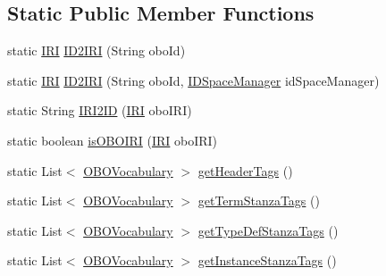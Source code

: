 \subsection*{Static Public Member Functions}
\begin{DoxyCompactItemize}
\item 
static \hyperlink{classorg_1_1semanticweb_1_1owlapi_1_1model_1_1_i_r_i}{I\-R\-I} \hyperlink{enumorg_1_1coode_1_1owlapi_1_1obo_1_1parser_1_1_o_b_o_vocabulary_a042284d9ae0a8921d6fa4c9bd5c6926a}{I\-D2\-I\-R\-I} (String obo\-Id)
\item 
static \hyperlink{classorg_1_1semanticweb_1_1owlapi_1_1model_1_1_i_r_i}{I\-R\-I} \hyperlink{enumorg_1_1coode_1_1owlapi_1_1obo_1_1parser_1_1_o_b_o_vocabulary_a06ee04f728978117ac64294ea0a9bd10}{I\-D2\-I\-R\-I} (String obo\-Id, \hyperlink{classorg_1_1coode_1_1owlapi_1_1obo_1_1parser_1_1_i_d_space_manager}{I\-D\-Space\-Manager} id\-Space\-Manager)
\item 
static String \hyperlink{enumorg_1_1coode_1_1owlapi_1_1obo_1_1parser_1_1_o_b_o_vocabulary_a585870e0b27a1178b1a15287f03253ab}{I\-R\-I2\-I\-D} (\hyperlink{classorg_1_1semanticweb_1_1owlapi_1_1model_1_1_i_r_i}{I\-R\-I} obo\-I\-R\-I)
\item 
static boolean \hyperlink{enumorg_1_1coode_1_1owlapi_1_1obo_1_1parser_1_1_o_b_o_vocabulary_ae7fbec3af1224dd1adfe3b25eb2a02db}{is\-O\-B\-O\-I\-R\-I} (\hyperlink{classorg_1_1semanticweb_1_1owlapi_1_1model_1_1_i_r_i}{I\-R\-I} obo\-I\-R\-I)
\item 
static List$<$ \hyperlink{enumorg_1_1coode_1_1owlapi_1_1obo_1_1parser_1_1_o_b_o_vocabulary}{O\-B\-O\-Vocabulary} $>$ \hyperlink{enumorg_1_1coode_1_1owlapi_1_1obo_1_1parser_1_1_o_b_o_vocabulary_af20f3e5ee71abf35c4e0c42f8222b91a}{get\-Header\-Tags} ()
\item 
static List$<$ \hyperlink{enumorg_1_1coode_1_1owlapi_1_1obo_1_1parser_1_1_o_b_o_vocabulary}{O\-B\-O\-Vocabulary} $>$ \hyperlink{enumorg_1_1coode_1_1owlapi_1_1obo_1_1parser_1_1_o_b_o_vocabulary_ab177eb7f872b8c7bfb1832cf34977cd9}{get\-Term\-Stanza\-Tags} ()
\item 
static List$<$ \hyperlink{enumorg_1_1coode_1_1owlapi_1_1obo_1_1parser_1_1_o_b_o_vocabulary}{O\-B\-O\-Vocabulary} $>$ \hyperlink{enumorg_1_1coode_1_1owlapi_1_1obo_1_1parser_1_1_o_b_o_vocabulary_ad3d940ad60171c5d2b9f0ad6f0bcfba7}{get\-Type\-Def\-Stanza\-Tags} ()
\item 
static List$<$ \hyperlink{enumorg_1_1coode_1_1owlapi_1_1obo_1_1parser_1_1_o_b_o_vocabulary}{O\-B\-O\-Vocabulary} $>$ \hyperlink{enumorg_1_1coode_1_1owlapi_1_1obo_1_1parser_1_1_o_b_o_vocabulary_aec364868efd335ee10b2dccf27d3f10e}{get\-Instance\-Stanza\-Tags} ()
\end{DoxyCompactItemize}
